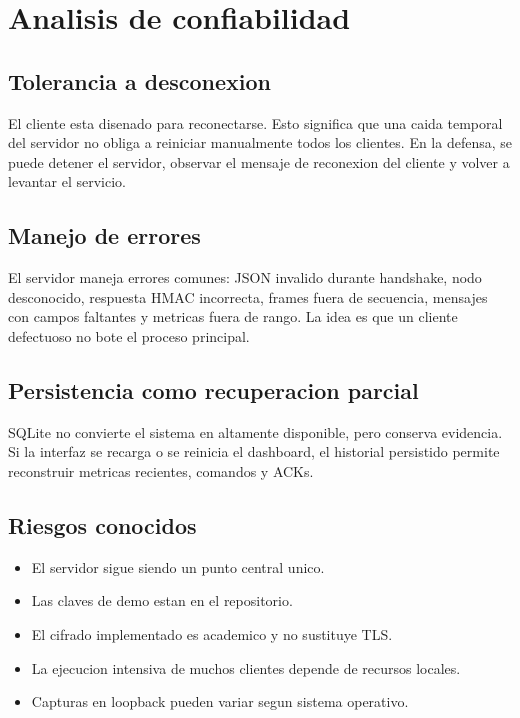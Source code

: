 \documentclass[11pt,letterpaper]{article}
\begin{document}
\newpage
\section{Analisis de confiabilidad}

\subsection{Tolerancia a desconexion}

El cliente esta disenado para reconectarse. Esto significa que una caida temporal
del servidor no obliga a reiniciar manualmente todos los clientes. En la defensa,
se puede detener el servidor, observar el mensaje de reconexion del cliente y
volver a levantar el servicio.

\subsection{Manejo de errores}

El servidor maneja errores comunes: JSON invalido durante handshake, nodo
desconocido, respuesta HMAC incorrecta, frames fuera de secuencia, mensajes con
campos faltantes y metricas fuera de rango. La idea es que un cliente defectuoso
no bote el proceso principal.

\subsection{Persistencia como recuperacion parcial}

SQLite no convierte el sistema en altamente disponible, pero conserva evidencia.
Si la interfaz se recarga o se reinicia el dashboard, el historial persistido
permite reconstruir metricas recientes, comandos y ACKs.

\subsection{Riesgos conocidos}

\begin{itemize}
  \item El servidor sigue siendo un punto central unico.
  \item Las claves de demo estan en el repositorio.
  \item El cifrado implementado es academico y no sustituye TLS.
  \item La ejecucion intensiva de muchos clientes depende de recursos locales.
  \item Capturas en loopback pueden variar segun sistema operativo.
\end{itemize}
\end{document}
